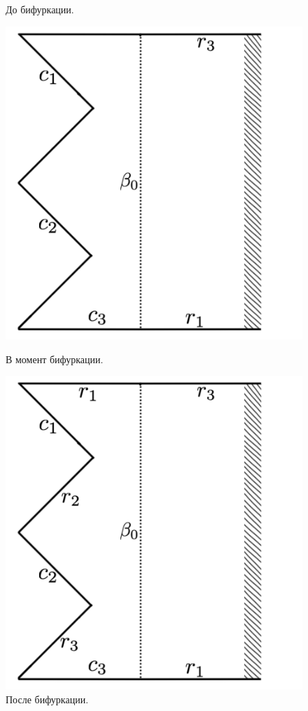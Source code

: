 \begin{figure}[!htb]
    \caption{До бифуркации.}
        \label{fig:pt10:_II_before_segment}
\endminipage\hfill
{}
\centering
\includegraphics[scale=0.11]{images/section3_circular/atoms/II/bifurcation/page_segment.pdf}
    \caption{В момент бифуркации.}
    \label{fig:pt10:_II_page_segment}
\endminipage\hfill
{}
\centering
\includegraphics[scale=0.11]{images/section3_circular/atoms/II/after/page_segment.pdf}
    \caption{После бифуркации.}
    \label{fig:pt10:_II_after_page_segment}
\endminipage\hfill
\end{figure}

